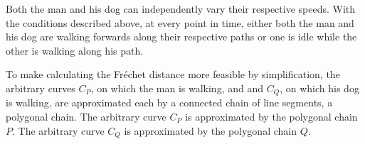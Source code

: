 Both the man and his dog can independently vary their respective speeds. With the conditions described above, at every point in time, either both the man and his dog are walking forwards along their respective paths or one is idle while the other is walking along his path.

To make calculating the Fréchet distance more feasible by simplification, the arbitrary curves $C_P$, on which the man is walking, and and $C_Q$, on which his dog is walking, are approximated each by a connected chain of line segments, a polygonal chain. The arbitrary curve $C_P$ is approximated by the polygonal chain $P$. The arbitrary curve $C_Q$ is approximated by the polygonal chain $Q$.